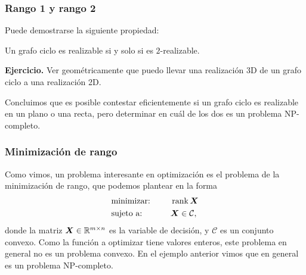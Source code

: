 \documentclass[aspectratio=169,12pt,spanish]{beamer}
\begin{document}
\begin{frame}
\frametitle{Rango 1 y rango 2}

Puede demostrarse la siguiente propiedad:

\begin{center}
Un grafo ciclo es realizable si y solo si es $2$-realizable.
\end{center}

\textbf{Ejercicio.} Ver geométricamente que puedo llevar una realización 3D de un grafo ciclo a una realización 2D.

Concluimos que es posible contestar eficientemente si un grafo ciclo es realizable en un plano o una recta, pero determinar en cuál de los dos es un problema NP-completo.

\end{frame}


\begin{frame}
\frametitle{Minimización de rango}

Como vimos, un problema interesante en optimización es el problema de la minimización de rango, que podemos plantear en la forma
\begin{alignat*}{2}
  & \text{minimizar: } & & \operatorname{rank} \bm{X}  \\
   & \text{sujeto a: } & \quad & \bm{X}  \in \mathcal{C},
\end{alignat*}
donde la matriz $\bm{X} \in \mathbb{R}^{m \times n}$ es la variable de decisión, y $\mathcal{C}$ es un conjunto convexo. Como la función a optimizar tiene valores enteros, este problema en general no es un problema convexo. En el ejemplo anterior vimos que en general es un problema NP-completo.

\end{frame}

\end{document}
